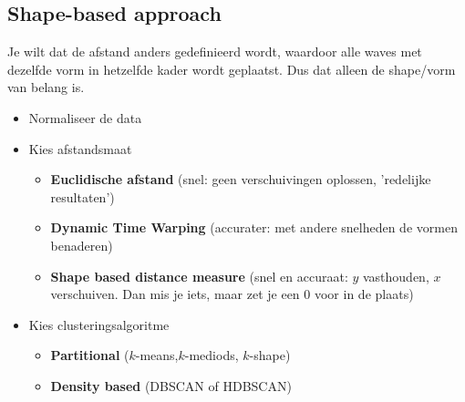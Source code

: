 {\subsection{Shape-based approach}
Je wilt dat de afstand anders gedefinieerd wordt, waardoor alle waves met dezelfde vorm in hetzelfde kader wordt geplaatst. Dus dat alleen de shape/vorm van belang is.
\begin{itemize}
    \item Normaliseer de data
    \item Kies afstandsmaat
    \begin{itemize}
        \item \textbf{Euclidische afstand} (snel: geen verschuivingen oplossen, 'redelijke resultaten')
        \item \textbf{Dynamic Time Warping} (accurater: met andere snelheden de vormen benaderen)
        \item \textbf{Shape based distance measure} (snel en accuraat: $y$ vasthouden, $x$ verschuiven. Dan mis je iets, maar zet je een 0 voor in de plaats)
    \end{itemize}
    \item Kies clusteringsalgoritme
    \begin{itemize}
        \item \textbf{Partitional} ($k$-means,$k$-mediods, $k$-shape)
        \item \textbf{Density based} (DBSCAN of HDBSCAN)
    \end{itemize}
\end{itemize}

}

